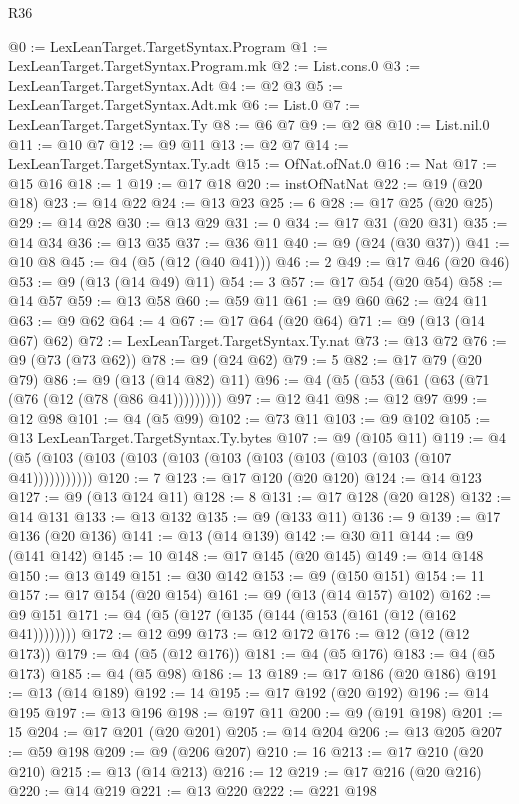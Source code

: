 \begin{lexlean}{R36}
\begin{coremodule}
@0 := LexLeanTarget.TargetSyntax.Program
@1 := LexLeanTarget.TargetSyntax.Program.mk
@2 := List.cons.{0}
@3 := LexLeanTarget.TargetSyntax.Adt
@4 := @2 @3
@5 := LexLeanTarget.TargetSyntax.Adt.mk
@6 := List.{0}
@7 := LexLeanTarget.TargetSyntax.Ty
@8 := @6 @7
@9 := @2 @8
@10 := List.nil.{0}
@11 := @10 @7
@12 := @9 @11
@13 := @2 @7
@14 := LexLeanTarget.TargetSyntax.Ty.adt
@15 := OfNat.ofNat.{0}
@16 := Nat
@17 := @15 @16
@18 := 1
@19 := @17 @18
@20 := instOfNatNat
@22 := @19 (@20 @18)
@23 := @14 @22
@24 := @13 @23
@25 := 6
@28 := @17 @25 (@20 @25)
@29 := @14 @28
@30 := @13 @29
@31 := 0
@34 := @17 @31 (@20 @31)
@35 := @14 @34
@36 := @13 @35
@37 := @36 @11
@40 := @9 (@24 (@30 @37))
@41 := @10 @8
@45 := @4 (@5 (@12 (@40 @41)))
@46 := 2
@49 := @17 @46 (@20 @46)
@53 := @9 (@13 (@14 @49) @11)
@54 := 3
@57 := @17 @54 (@20 @54)
@58 := @14 @57
@59 := @13 @58
@60 := @59 @11
@61 := @9 @60
@62 := @24 @11
@63 := @9 @62
@64 := 4
@67 := @17 @64 (@20 @64)
@71 := @9 (@13 (@14 @67) @62)
@72 := LexLeanTarget.TargetSyntax.Ty.nat
@73 := @13 @72
@76 := @9 (@73 (@73 @62))
@78 := @9 (@24 @62)
@79 := 5
@82 := @17 @79 (@20 @79)
@86 := @9 (@13 (@14 @82) @11)
@96 := @4 (@5 (@53 (@61 (@63 (@71 (@76 (@12 (@78 (@86 @41)))))))))
@97 := @12 @41
@98 := @12 @97
@99 := @12 @98
@101 := @4 (@5 @99)
@102 := @73 @11
@103 := @9 @102
@105 := @13 LexLeanTarget.TargetSyntax.Ty.bytes
@107 := @9 (@105 @11)
@119 := @4 (@5 (@103 (@103 (@103 (@103 (@103 (@103 (@103 (@103 (@103 (@107 @41)))))))))))
@120 := 7
@123 := @17 @120 (@20 @120)
@124 := @14 @123
@127 := @9 (@13 @124 @11)
@128 := 8
@131 := @17 @128 (@20 @128)
@132 := @14 @131
@133 := @13 @132
@135 := @9 (@133 @11)
@136 := 9
@139 := @17 @136 (@20 @136)
@141 := @13 (@14 @139)
@142 := @30 @11
@144 := @9 (@141 @142)
@145 := 10
@148 := @17 @145 (@20 @145)
@149 := @14 @148
@150 := @13 @149
@151 := @30 @142
@153 := @9 (@150 @151)
@154 := 11
@157 := @17 @154 (@20 @154)
@161 := @9 (@13 (@14 @157) @102)
@162 := @9 @151
@171 := @4 (@5 (@127 (@135 (@144 (@153 (@161 (@12 (@162 @41))))))))
@172 := @12 @99
@173 := @12 @172
@176 := @12 (@12 (@12 @173))
@179 := @4 (@5 (@12 @176))
@181 := @4 (@5 @176)
@183 := @4 (@5 @173)
@185 := @4 (@5 @98)
@186 := 13
@189 := @17 @186 (@20 @186)
@191 := @13 (@14 @189)
@192 := 14
@195 := @17 @192 (@20 @192)
@196 := @14 @195
@197 := @13 @196
@198 := @197 @11
@200 := @9 (@191 @198)
@201 := 15
@204 := @17 @201 (@20 @201)
@205 := @14 @204
@206 := @13 @205
@207 := @59 @198
@209 := @9 (@206 @207)
@210 := 16
@213 := @17 @210 (@20 @210)
@215 := @13 (@14 @213)
@216 := 12
@219 := @17 @216 (@20 @216)
@220 := @14 @219
@221 := @13 @220
@222 := @221 @198

\end{coremodule}
\end{lexlean}
